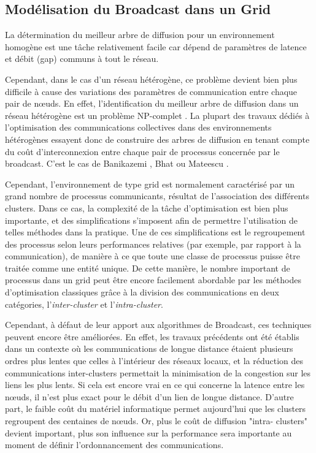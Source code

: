 \subsection{Modélisation du Broadcast dans un Grid}

La détermination du meilleur arbre de diffusion pour un environnement
homogène est une tâche relativement facile car dépend de paramètres de latence et débit (gap) communs à tout le réseau.  

Cependant, dans le cas d'un réseau hétérogène, ce problème devient
bien plus difficile à cause des variations des paramètres de communication entre chaque pair de n{\oe}uds. En effet, l'identification du meilleur arbre
de diffusion dans un réseau hétérogène est un problème NP-complet \cite{Bhat99}\cite{Beaumont04c,Beaumont05b}\cite{PangfengLiu04}.
La plupart des travaux dédiés à l'optimisation des communications
collectives dans des environnements hétérogènes essayent donc de construire des arbres de diffusion en tenant compte du coût d'interconnexion entre chaque pair de processus concernée par le broadcast. C'est le cas de Banikazemi \cite{Banikazemi98},
Bhat \cite{Bhat99,Bhat03} ou Mateescu \cite{Mateescu05}.

Cependant, l'environnement de type grid est normalement caractérisé
par un grand nombre de processus communicants, résultat de l'association
des différents clusters. Dans ce cas, la complexité de la
tâche d'optimisation est bien plus importante, et des simplifications
s'imposent afin de permettre l'utilisation de telles méthodes dans
la pratique. Une de ces simplifications est le regroupement des processus
selon leurs performances relatives (par exemple, par rapport à la
communication), de manière à ce que toute une classe de processus
puisse être traitée comme une entité unique. De cette manière, le nombre important de processus dans un grid peut être
encore facilement abordable par les méthodes d'optimisation classiques grâce à la division des communications en deux catégories, l'\textit{inter-cluster} et l'\textit{intra-cluster}. 


Cependant, à défaut de leur apport aux algorithmes de Broadcast, ces
techniques peuvent encore être améliorées. En effet, les travaux précédents
ont été établis dans un contexte où les communications de longue distance
étaient plusieurs ordres plus lentes que celles à l'intérieur des
réseaux locaux, et la réduction des communications inter-clusters permettait
la minimisation de la congestion sur les liens les plus lents. Si
cela est encore vrai en ce qui concerne la latence entre les n{\oe}uds,
il n'est plus exact pour le débit d'un lien de longue distance. D'autre
part, le faible coût du matériel informatique permet aujourd'hui que
les  clusters regroupent des centaines de n{\oe}uds. Or, plus le coût de
diffusion "intra- clusters" devient important, plus son influence
sur la performance sera importante au moment de définir l'ordonnancement
des communications.

